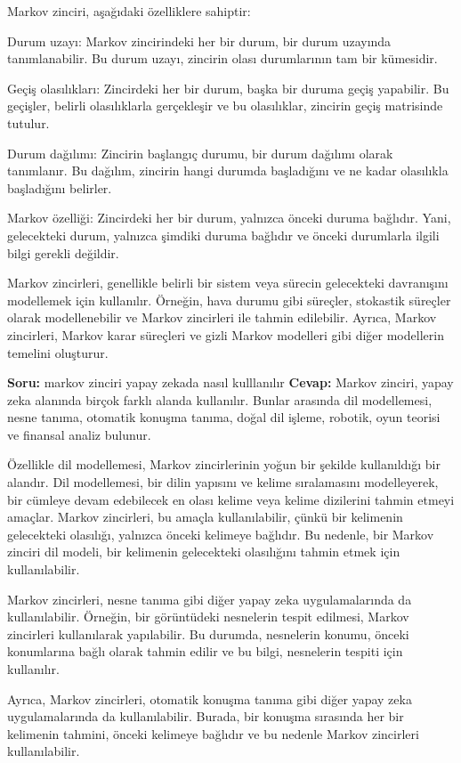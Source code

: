 \documentclass[11pt]{article}
\begin{document}
Markov zinciri, aşağıdaki özelliklere sahiptir:

Durum uzayı: Markov zincirindeki her bir durum, bir durum uzayında tanımlanabilir. Bu durum uzayı, zincirin olası durumlarının tam bir kümesidir.

Geçiş olasılıkları: Zincirdeki her bir durum, başka bir duruma geçiş yapabilir. Bu geçişler, belirli olasılıklarla gerçekleşir ve bu olasılıklar, zincirin geçiş matrisinde tutulur.

Durum dağılımı: Zincirin başlangıç durumu, bir durum dağılımı olarak tanımlanır. Bu dağılım, zincirin hangi durumda başladığını ve ne kadar olasılıkla başladığını belirler.

Markov özelliği: Zincirdeki her bir durum, yalnızca önceki duruma bağlıdır. Yani, gelecekteki durum, yalnızca şimdiki duruma bağlıdır ve önceki durumlarla ilgili bilgi gerekli değildir.

Markov zincirleri, genellikle belirli bir sistem veya sürecin gelecekteki davranışını modellemek için kullanılır. Örneğin, hava durumu gibi süreçler, stokastik süreçler olarak modellenebilir ve Markov zincirleri ile tahmin edilebilir. Ayrıca, Markov zincirleri, Markov karar süreçleri ve gizli Markov modelleri gibi diğer modellerin temelini oluşturur.

\textbf{Soru:} markov zinciri yapay zekada nasıl kulllanılır
\textbf{Cevap:} Markov zinciri, yapay zeka alanında birçok farklı alanda kullanılır. Bunlar arasında dil modellemesi, nesne tanıma, otomatik konuşma tanıma, doğal dil işleme, robotik, oyun teorisi ve finansal analiz bulunur.

Özellikle dil modellemesi, Markov zincirlerinin yoğun bir şekilde kullanıldığı bir alandır. Dil modellemesi, bir dilin yapısını ve kelime sıralamasını modelleyerek, bir cümleye devam edebilecek en olası kelime veya kelime dizilerini tahmin etmeyi amaçlar. Markov zincirleri, bu amaçla kullanılabilir, çünkü bir kelimenin gelecekteki olasılığı, yalnızca önceki kelimeye bağlıdır. Bu nedenle, bir Markov zinciri dil modeli, bir kelimenin gelecekteki olasılığını tahmin etmek için kullanılabilir.

Markov zincirleri, nesne tanıma gibi diğer yapay zeka uygulamalarında da kullanılabilir. Örneğin, bir görüntüdeki nesnelerin tespit edilmesi, Markov zincirleri kullanılarak yapılabilir. Bu durumda, nesnelerin konumu, önceki konumlarına bağlı olarak tahmin edilir ve bu bilgi, nesnelerin tespiti için kullanılır.

Ayrıca, Markov zincirleri, otomatik konuşma tanıma gibi diğer yapay zeka uygulamalarında da kullanılabilir. Burada, bir konuşma sırasında her bir kelimenin tahmini, önceki kelimeye bağlıdır ve bu nedenle Markov zincirleri kullanılabilir.
\end{document}
